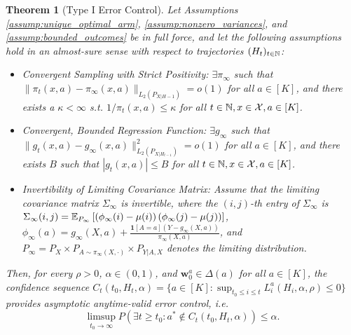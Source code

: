 \documentclass{article}
\newtheorem{theorem}{Theorem}
\begin{document}
\begin{theorem}[Type I Error Control]\label{thm:error_control} Let Assumptions \ref{assump:unique_optimal_arm}, \ref{assump:nonzero_variances}, and \ref{assump:bounded_outcomes} be in full force, and let the following assumptions hold in an almost-sure sense with respect to trajectories $(H_t)_{t \in \mathbb{N}}$: 
\begin{itemize}
    \item[(A1)] Convergent Sampling with Strict Positivity: $\exists \pi_\infty$ such that $\|\pi_t(x,a)- \pi_\infty(x,a)\|_{L_2(P_{X|H-1})} = o(1)$ for all $a \in [K]$, and there exists a $\kappa < \infty$ s.t. $1/\pi_t(x,a) \leq \kappa$ for all $t \in \mathbb{N}, x\in\mathcal{X}, a \in [K]$.
    \item[(A2)]  Convergent, Bounded Regression Function: $\exists g_\infty$ such that $\|g_t(x,a) - g_\infty(x,a)\|_{L_2(P_{X|H_{t-1}})}^2 = o(1)$ for all $a \in [K]$, and there exists $B$ such that $|g_t(x,a)| \leq B$ for all $t \in \mathbb{N},x\in\mathcal{X}, a \in [K]$.
    \item[(A3)] Invertibility of Limiting Covariance Matrix: Assume that the limiting covariance matrix $\Sigma_\infty$ is invertible, where the $(i,j)$-th entry of $\Sigma_\infty$ is $\Sigma_\infty(i,j) = \mathbb{E}_{P_\infty}\left[ \left(\phi_\infty(i) - \mu(i)\right) \left(\phi_\infty(j) - \mu(j)\right) \right]$, $\phi_\infty(a) = g_\infty(X,a) + \frac{\mathbf{1}[A=a](Y - g_\infty(X,a))}{\pi_\infty(X,a)}$, and $P_\infty = P_X \times P_{A \sim \pi_\infty(X, \cdot)} \times P_{Y|A,X}$ denotes the limiting distribution. 
\end{itemize}
Then, for every $\rho >0$, $\alpha \in (0,1)$, and $\bm{w}_0^a \in \Delta(a)$ for all $a\in [K]$,  the confidence sequence $C_t(t_0, H_t,\alpha) = \{a \in [K]: \sup_{t_0\leq i \leq t} L_i^a(H_i, \alpha, \rho) \leq 0 \}$ provides asymptotic anytime-valid error control, i.e. 
\begin{equation}
    \limsup_{t_0 \rightarrow \infty} P\left(\exists t \geq t_0 : a^* \not\in C_t(t_0, H_t, \alpha) \right)\leq \alpha.
\end{equation}

\end{theorem}
\end{document}
